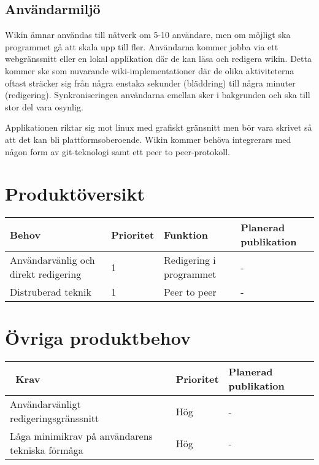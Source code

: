 \subsection{Användarmiljö}
Wikin ämnar användas till nätverk om 5-10 användare, men om möjligt ska programmet gå att skala upp till fler. Användarna kommer jobba via ett webgränssnitt eller en lokal applikation där de kan läsa och redigera wikin. Detta kommer ske som nuvarande wiki-implementationer där de olika aktiviteterna oftast sträcker sig från några enstaka sekunder (bläddring) till några minuter (redigering). Synkroniseringen användarna emellan sker i bakgrunden och ska till stor del vara osynlig.

Applikationen riktar sig mot linux med grafiskt gränsnitt men bör vara skrivet så att det kan bli plattformsoberoende. Wikin kommer behöva integrerars med någon form av git-teknologi samt ett peer to peer-protokoll.
\section{Produktöversikt}
\begin{tabular}{|l|l|l|l|}
\hline
Behov & Prioritet & Funktion & Planerad publikation \\
\hline
Användarvänlig och direkt redigering & 1 & Redigering i programmet & - \\
\hline
Distruberad teknik & 1 & Peer to peer & - \\
\hline
\end{tabular}
\section{Övriga produktbehov}
\begin{tabular}{|l|l|l|}
\hline\
Krav & Prioritet & Planerad publikation \\
\hline
Användarvänligt redigeringsgränssnitt & Hög & - \\
\hline
Låga minimikrav på användarens tekniska förmåga & Hög & - \\
\hline
\end{tabular}


